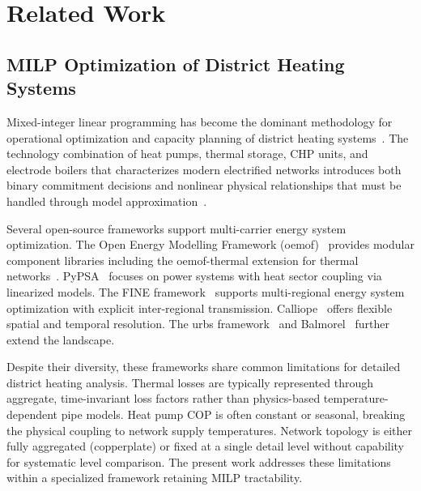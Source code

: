 \documentclass[review,3p]{elsarticle}
\begin{document}
\section{Related Work}
\label{sec:related_work}

\subsection{MILP Optimization of District Heating Systems}
\label{sec:rw_milp}

Mixed-integer linear programming has become the dominant methodology
for operational optimization and capacity planning of district heating
systems~\cite{Fang2016,Guelpa2019review}. The technology combination
of heat pumps, thermal storage, CHP units, and electrode boilers
that characterizes modern electrified networks introduces both binary
commitment decisions and nonlinear physical relationships that must
be handled through model approximation~\cite{Lund2014_4GDH}.

Several open-source frameworks support multi-carrier energy system
optimization. The Open Energy Modelling Framework
(oemof)~\cite{Hilpert2018_oemof} provides modular component libraries
including the oemof-thermal extension for thermal
networks~\cite{Krien2020_oemofthermal}. PyPSA~\cite{Brown2018_pypsa}
focuses on power systems with heat sector coupling via linearized
models. The FINE framework~\cite{Welder2018_FINE} supports
multi-regional energy system optimization with explicit inter-regional
transmission. Calliope~\cite{Pfenninger2018_calliope} offers flexible
spatial and temporal resolution. The urbs framework~\cite{Dorfner2016_urbs}
and Balmorel~\cite{Wiese2018_balmorel} further extend the landscape.

Despite their diversity, these frameworks share common limitations
for detailed district heating analysis. Thermal losses are typically
represented through aggregate, time-invariant loss factors rather than
physics-based temperature-dependent pipe models. Heat pump COP is
often constant or seasonal, breaking the physical coupling to network
supply temperatures. Network topology is either fully aggregated
(copperplate) or fixed at a single detail level without capability
for systematic level comparison. The present work addresses these
limitations within a specialized framework retaining MILP tractability.
\end{document}
